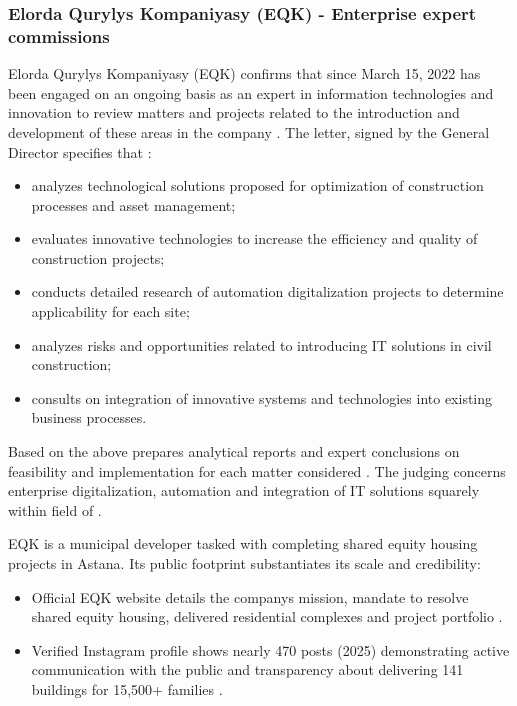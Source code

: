 \subsubsection{Elorda Qurylys Kompaniyasy (EQK) - Enterprise expert commissions}

\label{subsubsec:JudgingEQK}

Elorda Qurylys Kompaniyasy (EQK) confirms that since March 15, 2022 \mrl{} has been engaged on an ongoing basis as an expert in information technologies and innovation to review matters and projects related to the introduction and development of these areas in the company . The letter, signed by the General Director specifies that \mrl:
\vspace{-0.5\baselineskip}
\begin{itemize}[nosep]
\item analyzes technological solutions proposed for optimization of construction processes and asset management;
\item evaluates innovative technologies to increase the efficiency and quality of construction projects;
\item conducts detailed research of automation digitalization projects to determine applicability for each site;
\item analyzes risks and opportunities related to introducing IT solutions in civil construction;
\item consults on integration of innovative systems and technologies into existing business processes.
\end{itemize}

Based on the above \mrl{} prepares analytical reports and expert conclusions on feasibility and implementation for each matter considered . The judging concerns enterprise digitalization, automation and integration of IT solutions squarely within \mrls field of \fie.

EQK is a municipal developer tasked with completing shared equity housing projects in Astana. Its public footprint substantiates its scale and credibility:
\vspace{-0.5\baselineskip}
\begin{itemize}[nosep]
\item Official EQK website details the companys mission, mandate to resolve shared equity housing, delivered residential complexes and project portfolio .
\item Verified Instagram profile shows nearly 470 posts (2025) demonstrating active communication with the public and transparency about delivering 141 buildings for 15,500+ families .
\end{itemize}
